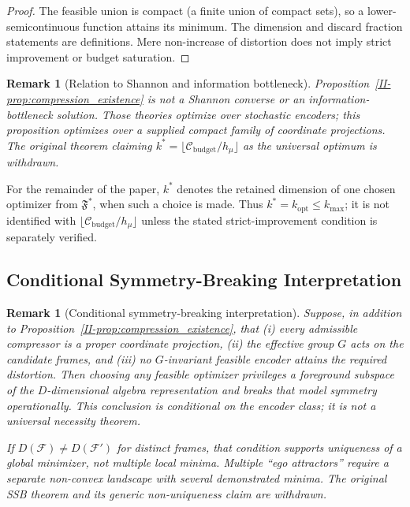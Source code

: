 \documentclass[12pt,a4paper,openany]{book}
\newtheorem{remark}[theorem]{Remark}
\begin{document}
\begin{proof}
The feasible union is compact (a finite union of compact sets), so a
lower-semicontinuous function attains its minimum.  The dimension and
discard fraction statements are definitions.  Mere non-increase of
distortion does not imply strict improvement or budget saturation.
\end{proof}

\begin{remark}[Relation to Shannon and information bottleneck]
Proposition~\ref{II-prop:compression_existence} is not a Shannon converse
or an information-bottleneck solution.  Those theories optimize over
stochastic encoders; this proposition optimizes over a supplied compact
family of coordinate projections.  The original theorem claiming
$k^*=\lfloor\mathcal C_{\mathrm{budget}}/h_\mu\rfloor$ as the universal
optimum is withdrawn.
\end{remark}

For the remainder of the paper, $k^*$ denotes the retained dimension of
one chosen optimizer from $\mathfrak F^*$, when such a choice is made.
Thus $k^*=k_{\mathrm{opt}}\leq k_{\max}$; it is not identified with
$\lfloor\mathcal C_{\mathrm{budget}}/h_\mu\rfloor$ unless the stated
strict-improvement condition is separately verified.

\subsection{Conditional Symmetry-Breaking Interpretation}
\label{II-subsec:SSB}

\begin{remark}[Conditional symmetry-breaking interpretation]
\label{II-rem:conditional_ssb}
Suppose, in addition to Proposition~\ref{II-prop:compression_existence},
that (i) every admissible compressor is a proper coordinate projection,
(ii) the effective group $G$ acts on the candidate frames, and
(iii) no $G$-invariant feasible encoder attains the required distortion.
Then choosing any feasible optimizer privileges a foreground subspace
of the $D$-dimensional algebra representation and breaks that model
symmetry operationally.  This conclusion is conditional on the encoder
class; it is not a universal necessity theorem.

If $D(\mathcal F)\neq D(\mathcal F')$ for distinct frames, that
condition supports uniqueness of a global minimizer, not multiple local
minima.  Multiple ``ego attractors'' require a separate non-convex
landscape with several demonstrated minima.  The original SSB theorem
and its generic non-uniqueness claim are withdrawn.
\end{remark}
\end{document}
